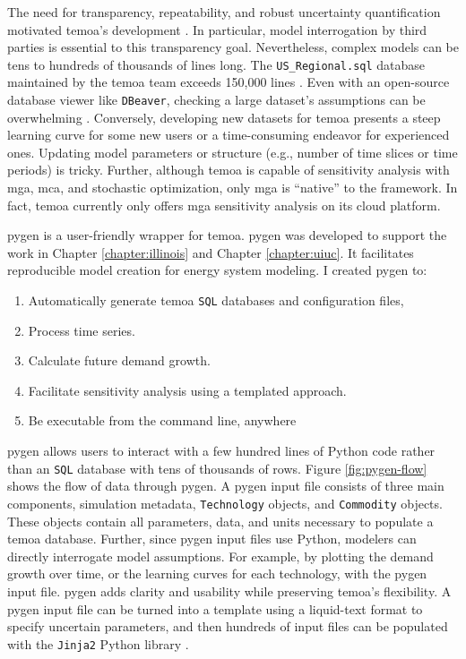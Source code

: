 The need for transparency, repeatability, and robust uncertainty quantification
motivated \gls{temoa}'s development \cite{hunter_modeling_2013}.
In particular, model interrogation by third parties is essential to this transparency
goal. Nevertheless, complex models can be tens to hundreds of thousands of lines long.
The \texttt{US\_Regional.sql} database maintained by the \gls{temoa} team exceeds
150,000 lines \cite{model_databases_2021}. Even with an open-source
database viewer like \texttt{DBeaver}, checking a large dataset's assumptions can be
overwhelming \cite{noauthor_dbeaver_nodate}. Conversely, developing new datasets
for \gls{temoa} presents a steep learning curve for some new users or a time-consuming
endeavor for experienced ones. Updating model parameters or structure (e.g., number
of time slices or time periods) is tricky. Further, although \gls{temoa}
is capable of sensitivity analysis with \gls{mga}, \gls{mca}, and stochastic
optimization, only \gls{mga} is ``native'' to the framework. In fact, \gls{temoa}
currently only offers \gls{mga} sensitivity analysis on its cloud platform.

\gls{pygen} is a user-friendly wrapper for \gls{temoa}. \gls{pygen} was developed
to support the work in Chapter \ref{chapter:illinois} and Chapter \ref{chapter:uiuc}.
It facilitates reproducible model creation for energy system modeling.
I created \gls{pygen} to:
\begin{enumerate}
  \item Automatically generate \gls{temoa} \texttt{SQL} databases and configuration files,
  \item Process time series.
  \item Calculate future demand growth.
  \item Facilitate sensitivity analysis using a templated approach.
  \item Be executable from the command line, anywhere
\end{enumerate}
\gls{pygen} allows users to interact with a few hundred lines of Python code rather
than an \texttt{SQL} database with tens of thousands of rows.
Figure \ref{fig:pygen-flow} shows the flow of data through \gls{pygen}.
A \gls{pygen} input file consists of three main components, simulation metadata,
\texttt{Technology} objects, and \texttt{Commodity} objects. These objects
contain all parameters, data, and units necessary to populate a \gls{temoa}
database. Further, since \gls{pygen} input files use Python, modelers
can directly interrogate model assumptions. For example, by plotting the demand
growth over time, or the learning curves for each technology, with the \gls{pygen}
input file.
\gls{pygen} adds clarity and usability while preserving \gls{temoa}'s flexibility.
A \gls{pygen} input file can be turned into a template using a liquid-text format
to specify uncertain parameters, and then hundreds of input files can be
populated with the \texttt{Jinja2} Python library \cite{noauthor_jinja_2022}.

